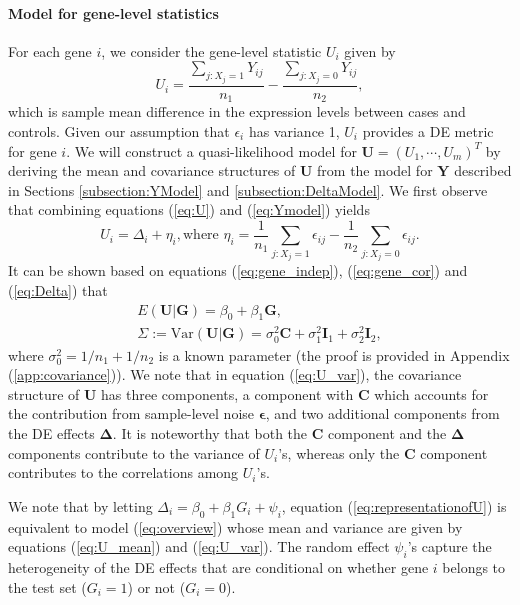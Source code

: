 	\paragraph{Model for gene-level statistics}\label{subsection:UModel}
	For each gene $i$, we consider the gene-level statistic $U_i$ given by 
	\begin{equation}
	\label{eq:U}
	U_i = \dfrac{\sum_{j: X_j=1}Y_{ij}}{n_1} - \dfrac{\sum_{j: X_j=0}Y_{ij}}{n_2},
	\end{equation}
	which is sample mean difference in the expression levels between cases and controls. Given our
	assumption that $\epsilon_i$ has variance 1, $U_i$ provides a DE metric for gene $i$. We will
	construct a quasi-likelihood model for $\bm U=(U_1,\cdots,U_m)^T$ by deriving the mean and
	covariance structures of $\bm U$ from the model for $\bm Y$ described in Sections
	\ref{subsection:YModel} and \ref{subsection:DeltaModel}. We first observe that combining 
	equations (\ref{eq:U}) and (\ref{eq:Ymodel}) yields
	\begin{equation}\label{eq:representationofU}
	U_i = \Delta_i + \eta_i, \text{where } \eta_i = \dfrac{1}{n_1}\sum_{j: X_j=1}\epsilon_{ij}-
	\dfrac{1}{n_2}\sum_{j: X_j=0}\epsilon_{ij}.
	\end{equation}
	It can be shown based on equations (\ref{eq:gene_indep}), (\ref{eq:gene_cor}) and 
	(\ref{eq:Delta}) that
	\begin{gather}
	E(\bm U|\bm G) = \beta_0+\beta_1 \bm G,\label{eq:U_mean}\\
	\Sigma:=\mbox{Var}(\bm U|\bm G) = \sigma_0^2\bm C + \sigma_1^2\bm I_1+\sigma_2^2\bm
	I_2,\label{eq:U_var}
	\end{gather}
	where $\sigma_0^2=1/n_1+1/n_2$ is a known parameter (the proof is provided in Appendix 
	(\ref{app:covariance})). We note that in equation (\ref{eq:U_var}), the	covariance structure of 
	$\bm U$ has three components, a component with $\bm C$ which accounts for the contribution from 
	sample-level noise $\bm \epsilon$, and two additional components from the DE effects $\bm 
	\Delta$. It is noteworthy that both the $\bm C$ component and the $\bm \Delta$ components 
	contribute to the variance of $U_i$'s, whereas only the $\bm C$ component contributes to
	the correlations among $U_i$'s.
	
	We note that by letting $\Delta_i = \beta_0 + \beta_1 G_i + \psi_i$, equation 
	(\ref{eq:representationofU}) is equivalent to model (\ref{eq:overview}) whose mean 
	and variance are given by equations (\ref{eq:U_mean}) and (\ref{eq:U_var}). The random effect 
	$\psi_i$'s capture the heterogeneity of the DE effects that are conditional on whether gene $i$ 
	belongs to the test set ($G_i=1$) or not ($G_i= 0$).
	
